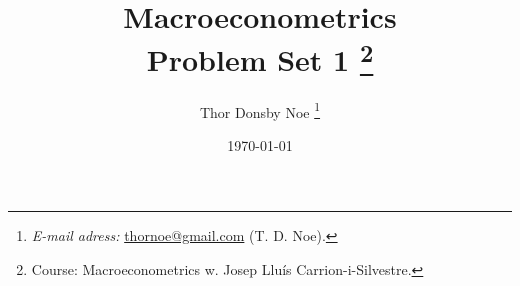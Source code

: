 \titlehead{ \centering\texttt{[image: 03\_figures/logo]}}

\title{\Huge Macroeconometrics %
\\ \huge Problem Set 1 %
\thanks{Course: Macroeconometrics w. Josep Lluís Carrion-i-Silvestre.
}
}

\author[a]{Thor Donsby Noe
\thanks{ %
\textit{E-mail adress:} \href{mailto:thornoe@gmail.com}{thornoe@gmail.com} (T. D. Noe).}
}

\date{\normalsize \today %
  }

%         
